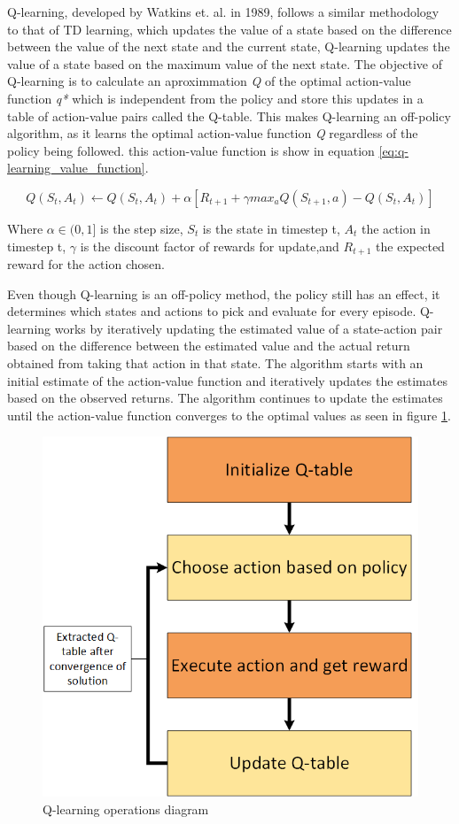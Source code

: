Q-learning, developed by Watkins et. al. \cite{} in 1989, follows a similar methodology to that of TD learning, which updates the value of a state based on the difference between the value of the next state and the current state, Q-learning updates the value of a state based on the maximum value of the next state. The objective of Q-learning is to calculate an aproximmation \textit{Q} of the optimal action-value function \textit{q*} which is independent from the policy and store this updates in a table of action-value pairs called the Q-table. This makes Q-learning an off-policy algorithm, as it learns the optimal action-value function \textit{Q} regardless of the policy being followed. this action-value function is show in equation \ref{eq:q-learning_value_function}.

\begin{equation}
    \label{eq:q-learning_value_function}
    Q(S_t, A_t) \leftarrow Q(S_t, A_t) + \alpha [R_{t+1} + \gamma max_a Q(S_{t+1}, a) - Q(S_t, A_t)]
\end{equation}

Where $\alpha \in (0,1]$ is the step size, $S_t$ is the state in timestep t, $A_t$ the action in timestep t, $\gamma$ is the discount factor of rewards for update,and $R_{t+1}$ the expected reward for the action chosen.

Even though Q-learning is an off-policy method, the policy still has an effect, it determines which states and actions to pick and evaluate for every episode. Q-learning works by iteratively updating the estimated value of a state-action pair based on the difference between the estimated value and the actual return obtained from taking that action in that state. The algorithm starts with an initial estimate of the action-value function and iteratively updates the estimates based on the observed returns. The algorithm continues to update the estimates until the action-value function converges to the optimal values as seen in figure \ref{fig:Q-learning}.

\begin{figure}[!h]
    \centering
    \includegraphics[width=.5\textwidth]{fig/rl/Q-learning.png}
    \caption{Q-learning operations diagram}
    \label{fig:Q-learning}
\end{figure}

